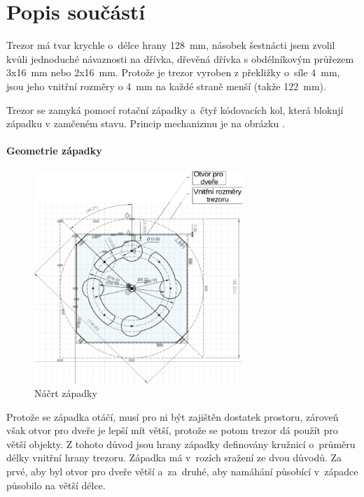 \section{Popis součástí}

Trezor má tvar krychle o~délce hrany 128~mm, násobek šestnácti jsem zvolil kvůli jednoduché návaznosti na dřívka, %
dřevěná dřívka s obdélníkovým průřezem 3x16~mm nebo 2x16~mm. 
Protože je trezor vyroben z překližky o~síle 4~mm, jsou jeho vnitřní rozměry o 4~mm na každé straně menší (takže 122~mm).

Trezor se zamyká pomocí rotační západky a~čtyř kódovacích kol, která blokují západku v zamčeném stavu. 
Princip mechanizmu je na obrázku .

\paragraph{Geometrie západky}
\begin{figure}[h]
	\centering
    \includegraphics[width=0.7\textwidth]{kapitoly/obrazky/M3/geometrie_zapadky.png}
    \caption{Náčrt západky}
    \label{fig:M3-geometrie-zapadky}
\end{figure} 

Protože se západka otáčí, musí pro ni být zajištěn dostatek prostoru, zároveň však otvor pro dveře je lepší mít větší, protože se potom trezor dá použít pro větší objekty.
Z tohoto důvod jsou hrany západky definovány kružnicí o~průměru délky vnitřní hrany trezoru. Západka má v~rozích sražení ze dvou důvodů. Za prvé, aby byl otvor pro
dveře větší a~za~druhé, aby namáhání působící v~západce působilo na větší délce.


